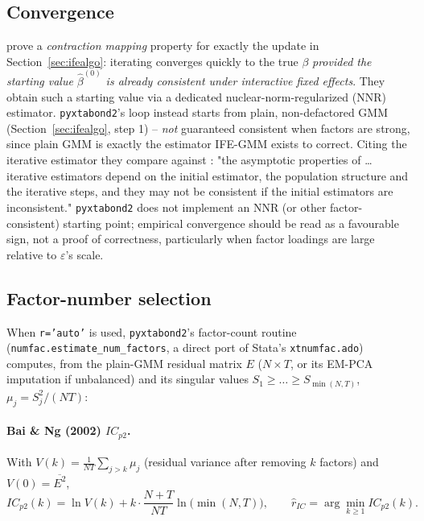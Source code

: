 \documentclass[11pt,a4paper]{article}
\newcommand{\pkg}{\texttt{pyxtabond2}}
\begin{document}
\subsection{Convergence}
\label{sec:convergence}

\citet{HongSuJiang2022} prove a \emph{contraction mapping} property for
exactly the update in Section~\ref{sec:ifealgo}: iterating converges quickly
to the true $\beta$ \emph{provided the starting value $\hat\beta^{(0)}$ is
already consistent under interactive fixed effects}. They obtain such a
starting value via a dedicated nuclear-norm-regularized (NNR) estimator.
\pkg{}'s loop instead starts from plain, non-defactored GMM
(Section~\ref{sec:ifealgo}, step 1) -- \emph{not} guaranteed consistent when
factors are strong, since plain GMM is exactly the estimator IFE-GMM exists
to correct. Citing the iterative estimator they compare against
\citep[Jiang et al.\ 2021, as discussed in][]{HongSuJiang2022}: "the
asymptotic properties of \dots iterative estimators depend on the initial
estimator, the population structure and the iterative steps, and they may
not be consistent if the initial estimators are inconsistent." \pkg{} does
not implement an NNR (or other factor-consistent) starting point; empirical
convergence should be read as a favourable sign, not a proof of correctness,
particularly when factor loadings are large relative to $\varepsilon$'s
scale.

\subsection{Factor-number selection}
\label{sec:factorselect}

When \texttt{r='auto'} is used, \pkg{}'s factor-count routine
(\texttt{numfac.estimate\_num\_factors}, a direct port of Stata's
\texttt{xtnumfac.ado}) computes, from the plain-GMM
residual matrix $E$ ($N\times T$, or its EM-PCA imputation if unbalanced) and
its singular values $S_1\ge\dots\ge S_{\min(N,T)}$, $\mu_j=S_j^2/(NT)$:

\paragraph{Bai \& Ng (2002) $IC_{p2}$.} With
$V(k)=\frac1{NT}\sum_{j>k}\mu_j$ (residual variance after removing $k$
factors) and $V(0)=\overline{E^2}$,
\[
  IC_{p2}(k) = \ln V(k) + k\cdot\frac{N+T}{NT}\ln\big(\min(N,T)\big),
  \qquad \hat r_{IC} = \arg\min_{k\ge1} IC_{p2}(k).
\]
\end{document}
